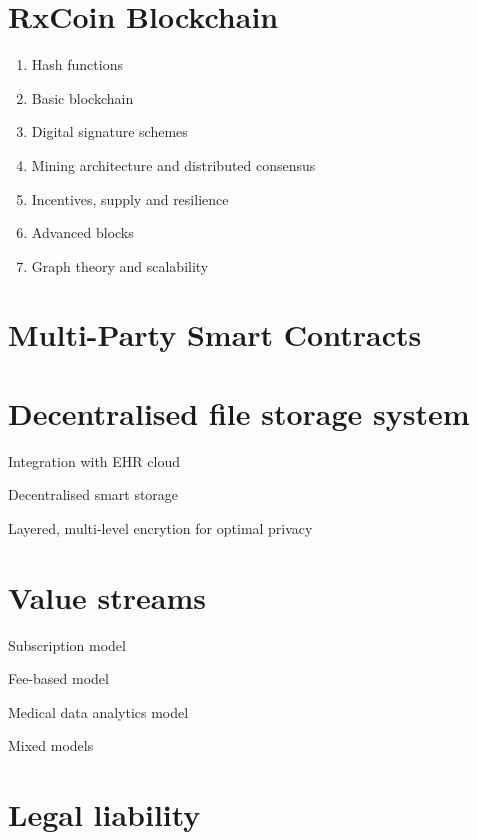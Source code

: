 \documentclass[a4paper,11pt]{article}
\begin{document}
\section{RxCoin Blockchain}
   \begin{enumerate}
   \item Hash functions
   \item Basic blockchain
   \item Digital signature schemes
   \item Mining architecture and distributed consensus
   \item Incentives, supply and resilience
   \item Advanced blocks 
    \item Graph theory and scalability
\end{enumerate}
   
  
\section{Multi-Party Smart Contracts}
   \begin{enumerate}
\end{enumerate}
   

\section{Decentralised file storage system}
   \item Integration with EHR cloud
   \item Decentralised smart storage
   \item Layered, multi-level encrytion for optimal privacy
   \begin{enumerate}

\end{enumerate}
   
  
\section{Value streams}
   \item Subscription model
   \item Fee-based model
   \item Medical data analytics model
   \item Mixed models
   \begin{enumerate}
\end{enumerate}
   

\section{Legal liability}
   \begin{enumerate}
\end{enumerate}
   
\end{document}
